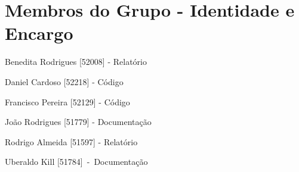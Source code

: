 \chapter{Membros do Grupo -\/ Identidade e Encargo}
\hypertarget{Team20_Membros}{}\label{Team20_Membros}

\begin{DoxyItemize}
\item Benedita Rodrigues \mbox{[}52008\mbox{]} -\/ Relatório ~\newline

\item Daniel Cardoso \mbox{[}52218\mbox{]} -\/ Código ~\newline

\item Francisco Pereira \mbox{[}52129\mbox{]} -\/ Código ~\newline

\item João Rodrigues \mbox{[}51779\mbox{]} -\/ Documentação ~\newline

\item Rodrigo Almeida \mbox{[}51597\mbox{]} -\/ Relatório ~\newline

\item Uberaldo Kill \mbox{[}51784\mbox{]} -\/ \+Documentação ~\newline

\end{DoxyItemize}